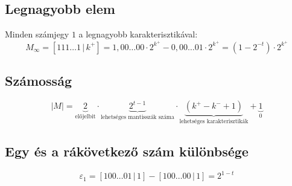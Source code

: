 \documentclass[a4paper,12pt]{article}
\theoremstyle{definition}
\begin{document}
	\subsection{Legnagyobb elem}
	Minden számjegy $1$ a legnagyobb karakterisztikával:
	\[
	M_{\infty} = \left[111 \dots 1 \, | \, k^+\right] = 1,00\dots00 \cdot 2^{k^+} - 0,00\dots01 \cdot 2^{k^+} = (1-2^{-t}) \cdot 2^{k^+}
	\]
	
	\subsection{Számosság}
	\[
	\left| M \right| = \underbrace{2}_{\text{előjelbit}} \cdot \underbrace{2^{t-1}}_{\text{lehetséges mantisszák száma}} \cdot \underbrace{(k^+ - k^- + 1)}_{\text{lehetséges karakterisztikák}} + \underbrace{1}_{0}
	\]
	
	\subsection{Egy és a rákövetkező szám különbsége}
	\[
	\varepsilon_1 = \left[ 100\dots01 \, | \, 1 \right] - \left[ 100\dots00 \, | \, 1 \right] = 2^{1-t}
	\]
\end{document}

